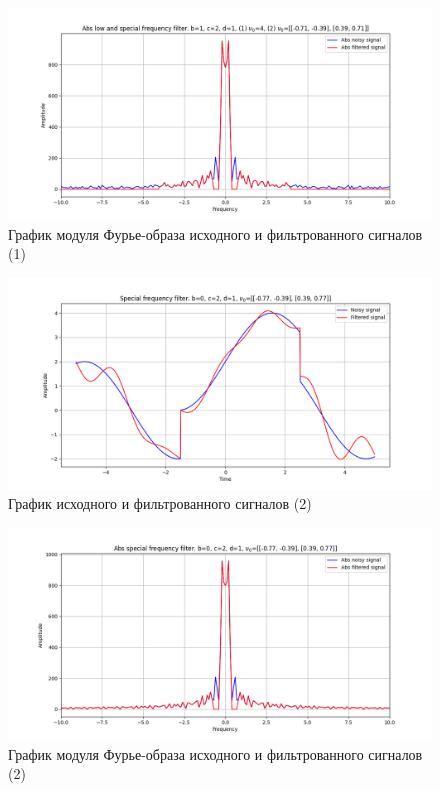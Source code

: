 \documentclass[a4paper, 12pt]{article}
\begin{document}
    \begin{figure}[!htb]
        \centering
        \includegraphics[scale=0.48]{1_3_abs_u_U_nospec.png}
        \captionsetup{skip=0pt}
        \caption{График модуля Фурье-образа исходного и фильтрованного сигналов (1)}
        \label{fig:fig78}
    \end{figure}
    \begin{figure}[!htb]
        \centering
        \includegraphics[scale=0.48]{2_u_flt_u_nospec.png}
        \captionsetup{skip=0pt}
        \caption{График исходного и фильтрованного сигналов (2)}
        \label{fig:fig81}
    \end{figure}
    \begin{figure}[!htb]
        \centering
        \includegraphics[scale=0.48]{2_abs_u_U_nospec.png}
        \captionsetup{skip=0pt}
        \caption{График модуля Фурье-образа исходного и фильтрованного сигналов (2)}
        \label{fig:fig82}
    \end{figure}
\end{document}
